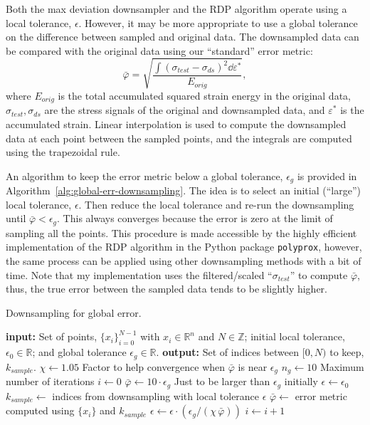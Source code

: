 \documentclass[a4paper,11pt]{article}
\begin{document}
Both the max deviation downsampler and the RDP algorithm operate using a local tolerance, $\epsilon$.
However, it may be more appropriate to use a global tolerance on the difference between sampled and original data.
The downsampled data can be compared with the original data using our ``standard'' error metric:
\begin{equation}
    \bar{\varphi} = \sqrt{\frac{\int (\sigma_{test} - \sigma_{ds})^2 \dd \varepsilon^*}{E_{orig}}},
\end{equation}
where $E_{orig}$ is the total accumulated squared strain energy in the original data, $\sigma_{test}, \sigma_{ds}$ are the stress signals of the original and downsampled data, and $\varepsilon^*$ is the accumulated strain.
Linear interpolation is used to compute the downsampled data at each point between the sampled points, and the integrals are computed using the trapezoidal rule.

An algorithm to keep the error metric below a global tolerance, $\epsilon_g$ is provided in Algorithm~\ref{alg:global-err-downsampling}.
The idea is to select an initial (``large'') local tolerance, $\epsilon$.
Then reduce the local tolerance and re-run the downsampling until $\bar{\varphi} < \epsilon_{g}$.
This always converges because the error is zero at the limit of sampling all the points.
This procedure is made accessible by the highly efficient implementation of the RDP algorithm in the Python package \texttt{polyprox}, however, the same process can be applied using other downsampling methods with a bit of time.
Note that my implementation uses the filtered/scaled ``$\sigma_{test}$'' to compute $\bar{\varphi}$, thus, the true error between the sampled data tends to be slightly higher.

\begin{algorithm}
	\caption{Downsampling for global error.}
	\label{alg:global-err-downsampling}
	\begin{algorithmic}[1]
		\State \textbf{input:} Set of points, $\{x_i\}_{i=0}^{N-1}$ with $x_i \in \mathbb{R}^n$ and $N \in \mathbb{Z}$; initial local tolerance, $\epsilon_0 \in \mathbb{R}$; and
        global tolerance $\epsilon_g \in \mathbb{R}$.
        \State \textbf{output:} Set of indices between $[0, N)$ to keep, $k_{sample}$.
        \State $\chi \gets 1.05$
        \Comment Factor to help convergence when $\bar{\varphi}$ is near $\epsilon_g$
        \State $n_g \gets 10$
        \Comment Maximum number of iterations
        \State $i \gets 0$
        \State $\bar{\varphi} \gets 10 \cdot \epsilon_g$
        \Comment Just to be larger than $\epsilon_g$ initially
        \State $\epsilon \gets \epsilon_0$
            \State $k_{sample} \gets$ indices from downsampling with local tolerance $\epsilon$
            \State $\bar{\varphi} \gets$ error metric computed using $\{x_i\}$ and $k_{sample}$
                \State $\epsilon \gets \epsilon \cdot (\epsilon_g / (\chi \, \bar{\varphi}))$
                \State $i \gets i + 1$
            \EndIf
		\EndWhile
\end{algorithmic}
\end{algorithm}
\end{document}
